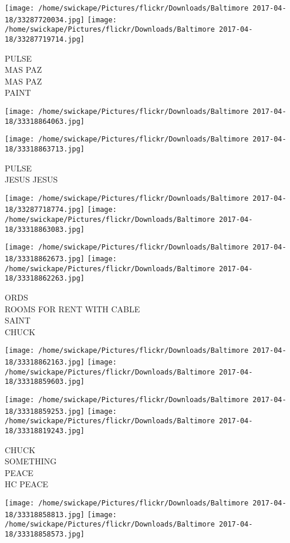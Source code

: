 \documentclass[10pt,letterpaper]{article}
\begin{document}
\texttt{[image: /home/swickape/Pictures/flickr/Downloads/Baltimore 2017-04-18/33287720034.jpg]}
\texttt{[image: /home/swickape/Pictures/flickr/Downloads/Baltimore 2017-04-18/33287719714.jpg]}

PULSE\\
MAS PAZ\\
MAS PAZ\\
PAINT
\pagebreak

\texttt{[image: /home/swickape/Pictures/flickr/Downloads/Baltimore 2017-04-18/33318864063.jpg]}

\vspace{0.25in}
\texttt{[image: /home/swickape/Pictures/flickr/Downloads/Baltimore 2017-04-18/33318863713.jpg]}

PULSE\\
JESUS JESUS
\pagebreak

\texttt{[image: /home/swickape/Pictures/flickr/Downloads/Baltimore 2017-04-18/33287718774.jpg]}
\texttt{[image: /home/swickape/Pictures/flickr/Downloads/Baltimore 2017-04-18/33318863083.jpg]}

\texttt{[image: /home/swickape/Pictures/flickr/Downloads/Baltimore 2017-04-18/33318862673.jpg]}
\texttt{[image: /home/swickape/Pictures/flickr/Downloads/Baltimore 2017-04-18/33318862263.jpg]}

ORDS\\
ROOMS FOR RENT WITH CABLE\\
SAINT\\
CHUCK
\pagebreak

\texttt{[image: /home/swickape/Pictures/flickr/Downloads/Baltimore 2017-04-18/33318862163.jpg]}
\texttt{[image: /home/swickape/Pictures/flickr/Downloads/Baltimore 2017-04-18/33318859603.jpg]}

\texttt{[image: /home/swickape/Pictures/flickr/Downloads/Baltimore 2017-04-18/33318859253.jpg]}
\texttt{[image: /home/swickape/Pictures/flickr/Downloads/Baltimore 2017-04-18/33318819243.jpg]}

CHUCK\\
SOMETHING\\
PEACE\\
HC PEACE
\pagebreak

\texttt{[image: /home/swickape/Pictures/flickr/Downloads/Baltimore 2017-04-18/33318858813.jpg]}
\texttt{[image: /home/swickape/Pictures/flickr/Downloads/Baltimore 2017-04-18/33318858573.jpg]}
\end{document}
